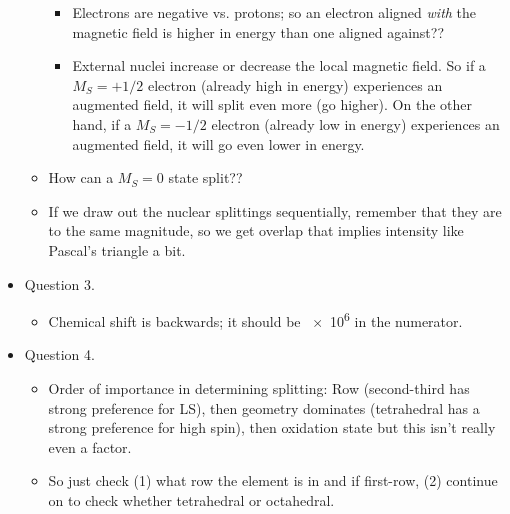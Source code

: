 \documentclass[../notes.tex]{subfiles}
\begin{document}
\begin{itemize}
\begin{itemize}
\begin{itemize}
            \item Electrons are negative vs. protons; so an electron aligned \emph{with} the magnetic field is higher in energy than one aligned against??
            \item External nuclei increase or decrease the local magnetic field. So if a $M_S=+1/2$ electron (already high in energy) experiences an augmented field, it will split even more (go higher). On the other hand, if a $M_S=-1/2$ electron (already low in energy) experiences an augmented field, it will go even lower in energy.
        \end{itemize}
        \item How can a $M_S=0$ state split??
        \item If we draw out the nuclear splittings sequentially, remember that they are to the same magnitude, so we get overlap that implies intensity like Pascal's triangle a bit.
    \end{itemize}
    \item Question 3.
    \begin{itemize}
        \item Chemical shift is backwards; it should be \num{e6} in the numerator.
    \end{itemize}
    \item Question 4.
    \begin{itemize}
        \item Order of importance in determining splitting: Row (second-third has strong preference for LS), then geometry dominates (tetrahedral has a strong preference for high spin), then oxidation state but this isn't really even a factor.
        \item So just check (1) what row the element is in and if first-row, (2) continue on to check whether tetrahedral or octahedral.
    \end{itemize}
\end{itemize}
\end{document}
